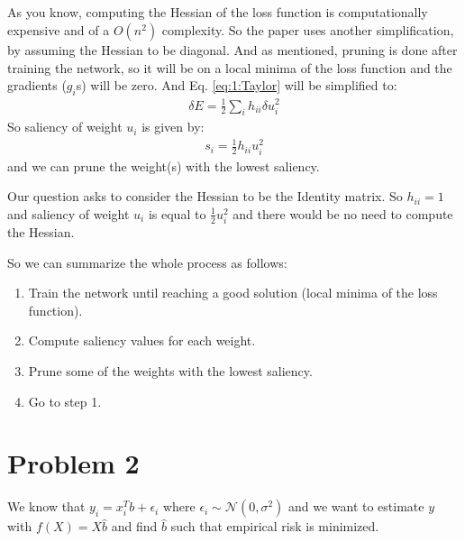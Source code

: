 \documentclass[]{article}
\numberwithin{equation}{section}
\newcommand{\transpose}{^T}
\begin{document}
\subsection{}
As you know, computing the Hessian of the loss function is computationally expensive and of a \(O(n^2)\) complexity.
So the paper uses another simplification, by assuming the Hessian to be diagonal.
And as mentioned, pruning is done after training the network, so it will be on a local minima of the loss function and the gradients (\(g_i\)s) will be zero.
And Eq. \ref{eq:1:Taylor} will be simplified to:
\begin{align}
\delta E = \frac{1}{2} \sum_{i} h_{ii} \delta u_i^2
\end{align}
So saliency of weight \(u_i\) is given by:
\begin{align}
s_i = \frac{1}{2} h_{ii}u_i^2
\end{align}
and we can prune the weight(s) with the lowest saliency.

Our question asks to consider the Hessian to be the Identity matrix.
So \( h_{ii} = 1 \) and saliency of weight \(u_i\) is equal to \( \frac{1}{2} u_i^2 \) and there would be no need to compute the Hessian.

So we can summarize the whole process as follows:
\begin{enumerate}
    \item Train the network until reaching a good solution (local minima of the loss function).
    \item Compute saliency values for each weight.
    \item Prune some of the weights with the lowest saliency.
    \item Go to step 1.
\end{enumerate} 

\section{Problem 2}
We know that \(y_i = x_i\transpose b + \epsilon_i\) where \(\epsilon_i \sim \mathcal{N}(0, \sigma^2)\) and we want to estimate \(y\) with \(f(X) = X\hat{b}\) and find \(\hat{b}\) such that empirical risk is minimized.
\end{document}
